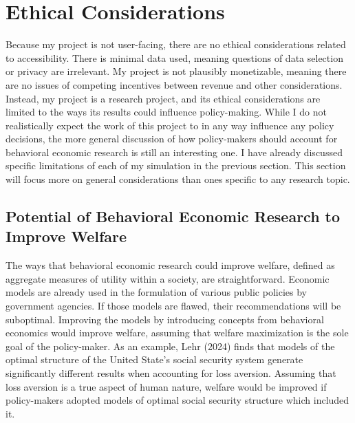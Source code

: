 \documentclass[10pt,twocolumn]{article}
\begin{document}
\section{Ethical Considerations}
Because my project is not user-facing, there are no ethical considerations related to accessibility. There is minimal data used, meaning questions of data selection or privacy are irrelevant. My project is not plausibly monetizable, meaning there are no issues of competing incentives between revenue and other considerations. Instead, my project is a research project, and its ethical considerations are limited to the ways its results could influence policy-making. While I do not realistically expect the work of this project to in any way influence any policy decisions, the more general discussion of how policy-makers should account for behavioral economic research is still an interesting one. I have already discussed specific limitations of each of my simulation in the previous section. This section will focus more on general considerations than ones specific to any research topic.

\subsection{Potential of Behavioral Economic Research to Improve Welfare}
The ways that behavioral economic research could improve welfare, defined as aggregate measures of utility within a society, are straightforward. Economic models are already used in the formulation of various public policies by government agencies. If those models are flawed, their recommendations will be suboptimal. Improving the models by introducing concepts from behavioral economics would improve welfare, assuming that welfare maximization is the sole goal of the policy-maker. As an example, Lehr (2024) finds that models of the optimal structure of the United State's social security system generate significantly different results when accounting for loss aversion.\cite{lehrLossAversion} Assuming that loss aversion is a true aspect of human nature, welfare would be improved if policy-makers adopted models of optimal social security structure which included it.  
\end{document}
